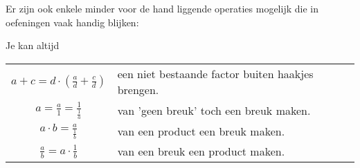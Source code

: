 \documentclass{ximera}
\begin{document}
Er zijn ook enkele minder voor de hand liggende operaties mogelijk die in oefeningen vaak handig blijken: 





\begin{proposition} Je kan altijd 
    
    \begin{center}
        \begin{tabular}{cl}          
            \( a + c = d\cdot \left(\frac{a}{d} + \frac{c}{d} \right) \)&
            een niet bestaande factor buiten haakjes brengen.\\ [7mm]
            
            \( a  = \frac{a}{1} = \frac {1}{\frac{1}{a}}\)&
            van 'geen breuk' toch een breuk maken.\\ [7mm]
            
            \( a\cdot b  = \frac{a}{\frac{1}{b}}\)&
            van een product een breuk maken. \\ [7mm]
            
            \( \frac{a}{b}  = a\cdot \frac{1}{b}\)&
            van een breuk een product maken. \\
            
        \end{tabular}
    \end{center}
\end{proposition}
\end{document}
